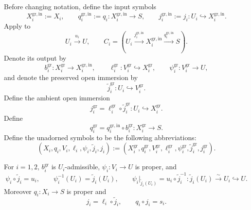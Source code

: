 \begin{definition}
  \label{def:nagata-two-open-graph-extensions}
  \lean{}

  Before changing notation, define the input symbols
  \[
    X_i^{\mathrm{gr,in}}:=X_i,\qquad
    q_i^{\mathrm{gr,in}}:=q_i\colon X_i^{\mathrm{gr,in}}\to S,\qquad
    j_i^{\mathrm{gr,in}}:=j_i\colon U_i\hookrightarrow X_i^{\mathrm{gr,in}}.
  \]
  Apply  to
  \[
    U_i\xrightarrow{u_i}U,\qquad
    C_i=(U_i\xrightarrow{j_i^{\mathrm{gr,in}}}X_i^{\mathrm{gr,in}}
      \xrightarrow{q_i^{\mathrm{gr,in}}}S).
  \]
  Denote its output by
  \[
    b_i^{\mathrm{gr}}\colon X_i^{\mathrm{gr}}\to X_i^{\mathrm{gr,in}},\qquad
    \ell_i^{\mathrm{gr}}\colon V_i^{\mathrm{gr}}\hookrightarrow
      X_i^{\mathrm{gr}},\qquad
    \psi_i^{\mathrm{gr}}\colon V_i^{\mathrm{gr}}\to U,
  \]
  and denote the preserved open immersion by
  \[
    \widetilde j_i^{\mathrm{gr}}\colon
      U_i\hookrightarrow V_i^{\mathrm{gr}}.
  \]
  Define the ambient open immersion
  \[
    j_i^{\mathrm{gr}}
      =\ell_i^{\mathrm{gr}}\circ\widetilde j_i^{\mathrm{gr}}
      \colon U_i\hookrightarrow X_i^{\mathrm{gr}}.
  \]
  Define
  \[
    q_i^{\mathrm{gr}}=q_i^{\mathrm{gr,in}}\circ b_i^{\mathrm{gr}}
      \colon X_i^{\mathrm{gr}}\to S.
  \]
  Define the unadorned symbols to be the following abbreviations:
  \[
    (X_i,q_i,V_i,\ell_i,\psi_i,\widetilde j_i,j_i)
      :=
    (X_i^{\mathrm{gr}},q_i^{\mathrm{gr}},V_i^{\mathrm{gr}},
      \ell_i^{\mathrm{gr}},\psi_i^{\mathrm{gr}},
      \widetilde j_i^{\mathrm{gr}},j_i^{\mathrm{gr}}).
  \]
\end{definition}

\begin{lemma}
  \label{lemma:nagata-two-open-graph-extensions}
  \lean{}

  For $i=1,2$, $b_i^{\mathrm{gr}}$ is $U_i$-admissible,
  $\psi_i\colon V_i\to U$ is proper, and
  \[
    \psi_i\circ\widetilde j_i=u_i,\qquad
    \psi_i^{-1}(U_i)=\widetilde j_i(U_i),\qquad
    \psi_i|_{\widetilde j_i(U_i)}
      =u_i\circ\widetilde j_i^{-1}\colon
        \widetilde j_i(U_i)\xrightarrow{\sim}U_i
        \hookrightarrow U.
  \]
  Moreover $q_i\colon X_i\to S$ is proper and
  \[
    j_i=\ell_i\circ\widetilde j_i,
    \qquad q_i\circ j_i=s_i.
  \]
\end{lemma}

